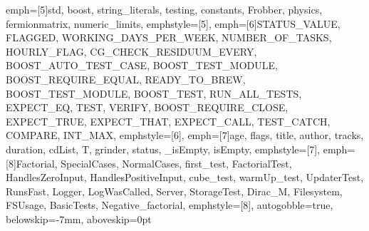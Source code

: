 {emph=[5]{std, boost, string_literals, testing, constants, Frobber, physics, fermionmatrix, numeric_limits},
emphstyle=[5]{\color{Maroon}}, %
emph=[6]{STATUS_VALUE, FLAGGED, WORKING_DAYS_PER_WEEK, NUMBER_OF_TASKS, HOURLY_FLAG,
         CG_CHECK_RESIDUUM_EVERY, BOOST_AUTO_TEST_CASE, BOOST_TEST_MODULE, BOOST_REQUIRE_EQUAL,
         READY_TO_BREW, BOOST_TEST_MODULE, BOOST_TEST, RUN_ALL_TESTS, EXPECT_EQ, TEST, VERIFY,
         BOOST_REQUIRE_CLOSE, EXPECT_TRUE, EXPECT_THAT, EXPECT_CALL, TEST_CATCH, COMPARE, INT_MAX},
emphstyle=[6]{\color{Gray}}, %
emph=[7]{age, flags, title, author, tracks, duration, cdList, T, grinder, status, _isEmpty, isEmpty},
emphstyle=[7]{\color{Peach!50!Purple}}, %
emph=[8]{Factorial, SpecialCases, NormalCases, first_test, FactorialTest, HandlesZeroInput,
         HandlesPositiveInput, cube_test, warmUp_test, UpdaterTest, RunsFast, Logger, LogWasCalled,
         Server, StorageTest, Dirac_M, Filesystem, FSUsage, BasicTests, Negative_factorial},
emphstyle=[8]{\color{Blue}}, %
autogobble=true, %
belowskip=-7mm,
aboveskip=0pt
}

